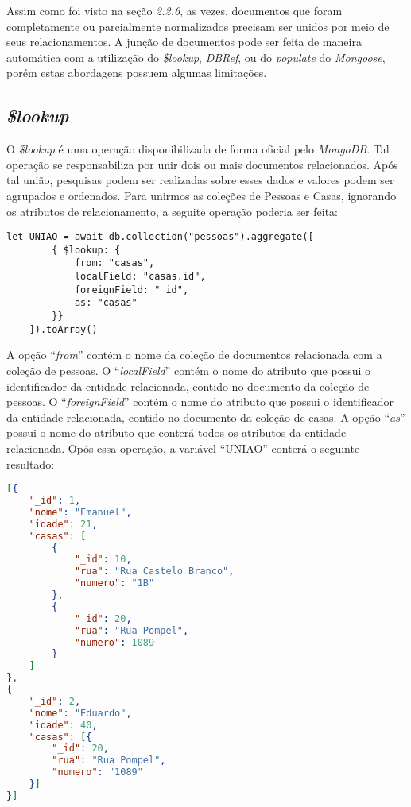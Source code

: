 Assim como foi visto na seção \textit{2.2.6}, as vezes, documentos que foram completamente ou parcialmente normalizados precisam ser unidos por meio de seus relacionamentos. A junção de documentos pode ser feita de maneira automática com a utilização do \textit{\$lookup}, \textit{DBRef}, ou do \textit{populate} do \textit{Mongoose}, porém estas abordagens possuem algumas limitações.

\subsection{\textit{\$lookup}}

O \textit{\$lookup} é uma operação disponibilizada de forma oficial pelo \textit{MongoDB}. Tal operação se responsabiliza por unir dois ou mais documentos relacionados. Após tal união, pesquisas podem ser realizadas sobre esses dados e valores podem ser agrupados e ordenados. Para unirmos as coleções de Pessoas e Casas, ignorando os atributos de relacionamento, a seguite operação poderia ser feita:

\begin{lstlisting}[style=ES6, caption={Junção de Documentos com \textit{\$lookup} Com Omissão}]
    let UNIAO = await db.collection("pessoas").aggregate([
        { $lookup: {
            from: "casas",
            localField: "casas.id",
            foreignField: "_id",
            as: "casas"
        }}
    ]).toArray()
\end{lstlisting}

A opção ``\textit{from}'' contém o nome da coleção de documentos relacionada com a coleção de pessoas. O ``\textit{localField}'' contém o nome do atributo que possui o identificador da entidade relacionada, contido no documento da coleção de pessoas. O ``\textit{foreignField}'' contém o nome do atributo que possui o identificador da entidade relacionada, contido no documento da coleção de casas. A opção ``\textit{as}'' possui o nome do atributo que conterá todos os atributos da entidade relacionada. Opós essa operação, a  variável ``UNIAO'' conterá o seguinte resultado:

\newpage

\begin{lstlisting}[language=json, caption={Junção de Documentos com Omissão}]
[{
    "_id": 1,
    "nome": "Emanuel",
    "idade": 21,
    "casas": [
        {
            "_id": 10,
            "rua": "Rua Castelo Branco",
            "numero": "1B"
        },
        {
            "_id": 20,
            "rua": "Rua Pompel",
            "numero": 1089
        }
    ]
},
{
    "_id": 2,
    "nome": "Eduardo",
    "idade": 40,
    "casas": [{
        "_id": 20,
        "rua": "Rua Pompel",
        "numero": "1089"
    }]
}]
\end{lstlisting}


